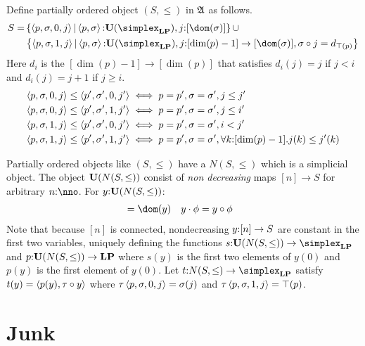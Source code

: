 \documentclass[csh.tex]{subfiles}
\begin{document}
\begin{definition}
Define partially ordered object $(S,\leq)$ in $\mathfrak A$ as follows.
\begin{align*} 
S =& \set{\tuplet{p,\sigma,0,j}|\tuplet{p,\sigma}\of\base(\simplex_\LP),j\of[\dom(\sigma)]}\cup\\&
\set{\tuplet{p,\sigma,1,j}|\tuplet{p,\sigma}\of\base(\simplex_\LP),
j\of[\dim(p)-1]\to [\dom(\sigma)],\sigma\circ j = d_{\top(p)}}\\
\end{align*}
Here $d_i$ is the  $[\dim(p)-1]\to[\dim(p)]$ that satisfies $d_i(j) = j$ if $j<i$ and $d_i(j) = j+1$ if $j\geq i$.
\begin{align*}
\left\langle p,\sigma,0,j \right\rangle\leq\left\langle p',\sigma',0,j' \right\rangle &
\iff p=p',\sigma=\sigma',j\leq j'\\
\left\langle p,\sigma,0,j \right\rangle\leq\left\langle p',\sigma',1,j' \right\rangle &
\iff p=p',\sigma=\sigma',j \leq i'\\ 
\left\langle p,\sigma,1,j \right\rangle\leq\left\langle p',\sigma',0,j' \right\rangle &
\iff p=p',\sigma=\sigma',i < j'\\ 
\left\langle p,\sigma,1,j \right\rangle\leq\left\langle p',\sigma',1,j' \right\rangle &
\iff p=p',\sigma=\sigma',\forall k\mathord :[\dim(p)-1].j(k)\leq j'(k)
\end{align*}

Partially ordered objects like $(S,\leq)$ have a  $N(S,\leq)$ which is a simplicial object. The object $\mathbf{U}(N(S,\leq))$ consist of \emph{non decreasing} maps $[n]\to S$ for arbitrary $n\of\nno$. For $y\mathord : \mathbf{U}(N(S,\leq))$:
\begin{align*}
[\dim(y)] &= \dom(y)&
y\cdot \phi &= y\circ \phi
\end{align*}
Note that because $[n]$ is connected, nondecreasing $y\mathord :[n]\to S$ are constant in the first two variables, uniquely defining the functions $s\of \base(N(S,\leq))\to \simplex_\LP$ and $p\mathord : \mathbf{U}(N(S,\leq))\to \mathbf{LP}$
where $s(y)$ is the first two elements of $y(0)$ and $p(y)$ is the first element of $y(0)$. Let $t\of N(S,\leq)\to \simplex_\LP$ satisfy 
$t(y) = \left\langle p(y),\tau\circ y \right\rangle$ where $\tau\left\langle p,\sigma,0,j \right\rangle = \sigma(j)$ and $\tau\left\langle p,\sigma,1,j \right\rangle = \top(p)$.

\end{definition}




\section{Junk}
\end{document}
